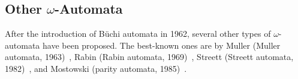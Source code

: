 \documentclass{scrreprt}
\newcommand{\om}{{$\omega$}}
\begin{document}







\subsection{Other \om-Automata}
After the introduction of Büchi automata in 1962, several other types of \om-automata have been proposed. The best-known ones are by Muller (Muller automata, 1963)~\cite{1963_muller}, Rabin (Rabin automata, 1969)~\cite{rabin1969decidability}, Streett (Streett automata, 1982)~\cite{Streett1982121}, and Mostowski (parity automata, 1985)~\cite{1985_mostowski}.
\end{document}
